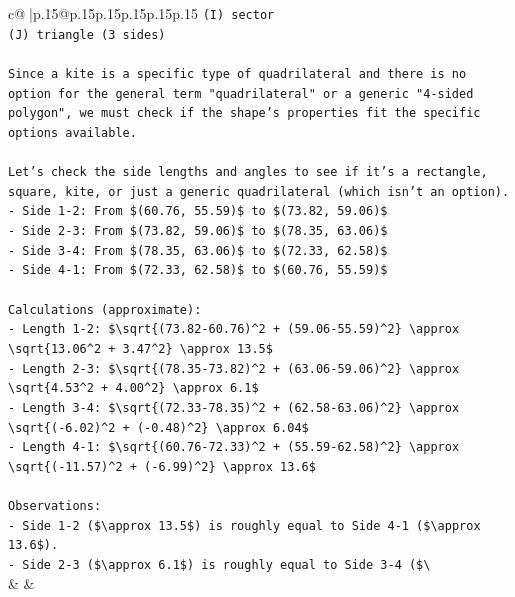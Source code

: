 \documentclass{article}
\begin{document}
{\begin{supertabular}{c@{$\;$}|p{.15\linewidth}@{}p{.15\linewidth}p{.15\linewidth}p{.15\linewidth}p{.15\linewidth}p{.15\linewidth}}
{{{\texttt{(I) sector} \\
\texttt{(J) triangle (3 sides)} \\
\\ 
\texttt{Since a kite is a specific type of quadrilateral and there is no option for the general term "quadrilateral" or a generic "4{-}sided polygon", we must check if the shape's properties fit the specific options available.} \\
\\ 
\texttt{Let's check the side lengths and angles to see if it's a rectangle, square, kite, or just a generic quadrilateral (which isn't an option).} \\
\texttt{{-} Side 1{-}2: From \$(60.76, 55.59)\$ to \$(73.82, 59.06)\$} \\
\texttt{{-} Side 2{-}3: From \$(73.82, 59.06)\$ to \$(78.35, 63.06)\$} \\
\texttt{{-} Side 3{-}4: From \$(78.35, 63.06)\$ to \$(72.33, 62.58)\$} \\
\texttt{{-} Side 4{-}1: From \$(72.33, 62.58)\$ to \$(60.76, 55.59)\$} \\
\\ 
\texttt{Calculations (approximate):} \\
\texttt{{-} Length 1{-}2: \$\textbackslash{}sqrt\{(73.82{-}60.76)\^{}2 + (59.06{-}55.59)\^{}2\} \textbackslash{}approx \textbackslash{}sqrt\{13.06\^{}2 + 3.47\^{}2\} \textbackslash{}approx 13.5\$} \\
\texttt{{-} Length 2{-}3: \$\textbackslash{}sqrt\{(78.35{-}73.82)\^{}2 + (63.06{-}59.06)\^{}2\} \textbackslash{}approx \textbackslash{}sqrt\{4.53\^{}2 + 4.00\^{}2\} \textbackslash{}approx 6.1\$} \\
\texttt{{-} Length 3{-}4: \$\textbackslash{}sqrt\{(72.33{-}78.35)\^{}2 + (62.58{-}63.06)\^{}2\} \textbackslash{}approx \textbackslash{}sqrt\{({-}6.02)\^{}2 + ({-}0.48)\^{}2\} \textbackslash{}approx 6.04\$} \\
\texttt{{-} Length 4{-}1: \$\textbackslash{}sqrt\{(60.76{-}72.33)\^{}2 + (55.59{-}62.58)\^{}2\} \textbackslash{}approx \textbackslash{}sqrt\{({-}11.57)\^{}2 + ({-}6.99)\^{}2\} \textbackslash{}approx 13.6\$} \\
\\ 
\texttt{Observations:} \\
\texttt{{-} Side 1{-}2 (\$\textbackslash{}approx 13.5\$) is roughly equal to Side 4{-}1 (\$\textbackslash{}approx 13.6\$).} \\
\texttt{{-} Side 2{-}3 (\$\textbackslash{}approx 6.1\$) is roughly equal to Side 3{-}4 (\$\textbackslash{}} \\
            }
        }
    }
    & & \\ \\


\end{supertabular}}
\end{document}
